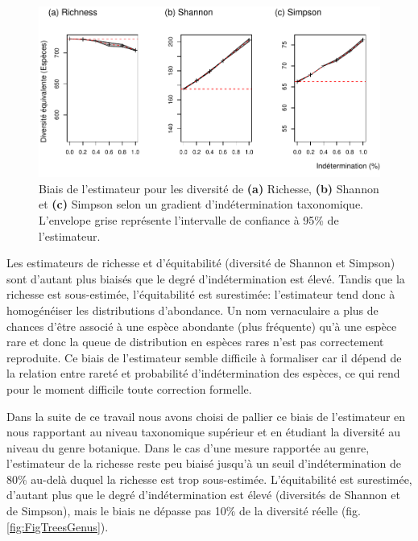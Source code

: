 \documentclass[
  11pt,
  french,
  A4paper,
  extrafontsizes,onecolumn,openright
  ]{memoir}
\begin{document}
\begin{figure}

{\centering \includegraphics[width=1\linewidth]{Manuscript_files/figure-latex/FigTreesSp-1} 

}

\caption{Biais de l'estimateur pour les diversité de \textbf{(a)} Richesse, \textbf{(b)} Shannon et \textbf{(c)} Simpson selon un gradient d'indétermination taxonomique. L'envelope grise représente l'intervalle de confiance à 95\% de l'estimateur.}\label{fig:FigTreesSp}
\end{figure}

Les estimateurs de richesse et d'équitabilité (diversité de Shannon et
Simpson) sont d'autant plus biaisés que le degré d'indétermination est
élevé. Tandis que la richesse est sous-estimée, l'équitabilité est
surestimée: l'estimateur tend donc à homogénéiser les distributions
d'abondance. Un nom vernaculaire a plus de chances d'être associé à une
espèce abondante (plus fréquente) qu'à une espèce rare et donc la queue
de distribution en espèces rares n'est pas correctement reproduite. Ce
biais de l'estimateur semble difficile à formaliser car il dépend de la
relation entre rareté et probabilité d'indétermination des espèces, ce
qui rend pour le moment difficile toute correction formelle.

Dans la suite de ce travail nous avons choisi de pallier ce biais de
l'estimateur en nous rapportant au niveau taxonomique supérieur et en
étudiant la diversité au niveau du genre botanique. Dans le cas d'une
mesure rapportée au genre, l'estimateur de la richesse reste peu biaisé
jusqu'à un seuil d'indétermination de 80\% au-delà duquel la richesse
est trop sous-estimée. L'équitabilité est surestimée, d'autant plus que
le degré d'indétermination est élevé (diversités de Shannon et de
Simpson), mais le biais ne dépasse pas 10\% de la diversité réelle
(fig.\ref{fig:FigTreesGenus}).
\end{document}
